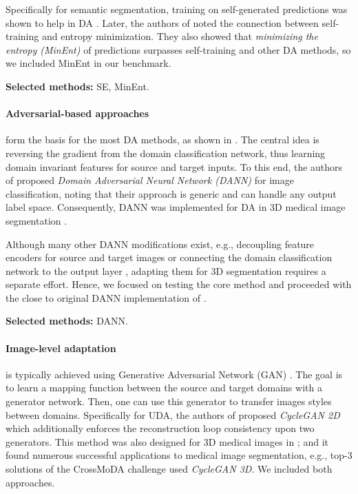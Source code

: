 Specifically for semantic segmentation, training on self-generated predictions was shown to help in DA \cite{self_training}. Later, the authors of \cite{entropy} noted the connection between self-training and entropy minimization. They also showed that \textit{minimizing the entropy (MinEnt)} of predictions surpasses self-training and other DA methods, so we included MinEnt in our benchmark.

\textbf{Selected methods:} SE, MinEnt.


\paragraph{Adversarial-based approaches} form the basis for the most DA methods, as shown in \cite{uda_segm_review_2020}. The central idea is reversing the gradient from the domain classification network, thus learning domain invariant features for source and target inputs. To this end, the authors of \cite{dann} proposed \textit{Domain Adversarial Neural Network (DANN)} for image classification, noting that their approach is generic and can handle any output label space. Consequently, DANN was implemented for DA in 3D medical image segmentation \cite{dann_medim}.

Although many other DANN modifications exist, e.g., decoupling feature encoders for source and target images \cite{adda} or connecting the domain classification network to the output layer \cite{tsai2018learning}, adapting them for 3D segmentation requires a separate effort. Hence, we focused on testing the core method and proceeded with the close to original DANN implementation of \cite{dann_medim}.

\textbf{Selected methods:} DANN.


\paragraph{Image-level adaptation} is typically achieved using Generative Adversarial Network (GAN) \cite{goodfellow2020generative}. The goal is to learn a mapping function between the source and target domains with a generator network. Then, one can use this generator to transfer images styles between domains. Specifically for UDA, the authors of \cite{cyclegan} proposed \textit{CycleGAN 2D} which additionally enforces the reconstruction loop consistency upon two generators. This method was also designed for 3D medical images in \cite{cyclegan3d}; and it found numerous successful applications to medical image segmentation, e.g., top-3 solutions of the CrossMoDA challenge \cite{crossmoda} used \textit{CycleGAN 3D}. We included both approaches.

